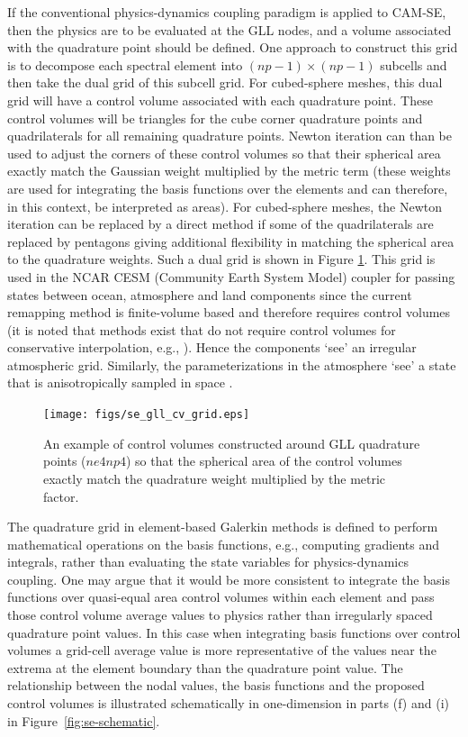 \documentclass[twocol]{ametsoc}
\begin{document}
If the conventional physics-dynamics coupling paradigm is applied to CAM-SE, then the physics are to be evaluated at the GLL nodes, and a volume associated with the quadrature point should be defined. {\color{red}One approach to construct this grid is to decompose each spectral element into $(np-1) \times (np-1)$ subcells and then take the dual grid of this subcell grid.  For cubed-sphere meshes, this dual grid will have a control volume associated with each quadrature point. These control volumes will be triangles for the cube corner quadrature points and quadrilaterals for all remaining quadrature points.  Newton iteration can than be used to adjust the corners of these control volumes so that their spherical area exactly match the Gaussian weight multiplied by the metric term (these weights are used for integrating the basis functions over the elements and can therefore, in this context, be interpreted as areas).  For cubed-sphere meshes, the Newton iteration can be replaced by a direct method if some of the quadrilaterals are replaced by pentagons giving additional flexibility in matching the spherical area to the quadrature weights. Such a dual grid is shown in Figure \ref{fig:cv-grids}.{}} This grid is used in the NCAR CESM (Community Earth System Model) coupler for passing states between ocean, atmosphere and land components since the current remapping method is finite-volume based and therefore requires control volumes (it is noted that methods exist that do not require control volumes for conservative interpolation, e.g., \cite{UT2015MWR}). Hence the components `see' an irregular atmospheric grid. Similarly, the parameterizations in the atmosphere `see' a state that is anisotropically sampled in space \citep[see Figure 1 and 5 in ][]{KetAl2008JGR}.

\begin{figure}[t]
\noindent\texttt{[image: figs/se\_gll\_cv\_grid.eps]}\\
\caption{An example of control volumes constructed around GLL quadrature points ($ne4np4$) so that the spherical area of the control volumes exactly match the quadrature weight multiplied by the metric factor.}
\label{fig:cv-grids}
\end{figure}


The quadrature grid in element-based Galerkin methods is defined to perform mathematical operations on the basis functions, e.g., computing gradients and integrals, rather than evaluating the state variables for physics-dynamics coupling. One may argue that it would be more consistent to integrate the basis functions over quasi-equal area control volumes within each element and pass those control volume average values to physics rather than irregularly spaced quadrature point values. In this case when integrating basis functions over control volumes a grid-cell average value is more representative of the values near the extrema at the element boundary than the quadrature point value. The relationship between the nodal values, the basis functions and the proposed control volumes is illustrated schematically in one-dimension in parts (f) and (i) in Figure~\ref{fig:se-schematic}. 
\end{document}

